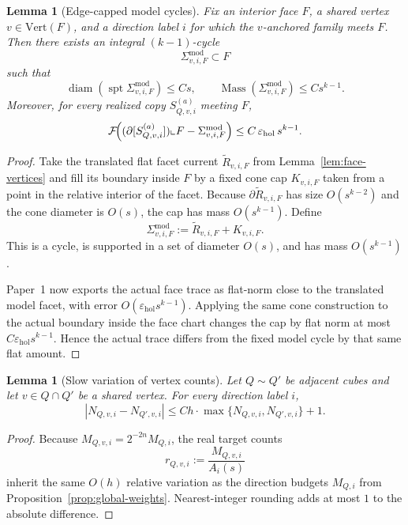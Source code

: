\documentclass[11pt]{article}
\numberwithin{equation}{section}
\theoremstyle{plain}
\newtheorem{lemma}[theorem]{Lemma}
\theoremstyle{definition}
\theoremstyle{remark}
\DeclareMathOperator{\Mass}{Mass}
\DeclareMathOperator{\spt}{spt}
\DeclareMathOperator{\diam}{diam}
\newcommand{\eps}{\varepsilon}
\newcommand{\calF}{\mathcal{F}}
\begin{document}
\begin{lemma}[Edge-capped model cycles]\label{lem:face-cycles}
Fix an interior face $F$, a shared vertex $v\in\mathrm{Vert}(F)$, and a direction label $i$ for which the $v$-anchored family meets $F$.  Then there exists an integral $(k-1)$-cycle
\[
\Sigma^{\mathrm{mod}}_{v,i,F}\subset F
\]
such that
\[
\diam(\spt \Sigma^{\mathrm{mod}}_{v,i,F})\le Cs,
\qquad
\Mass(\Sigma^{\mathrm{mod}}_{v,i,F})\le C s^{k-1}.
\]
Moreover, for every realized copy $S_{Q,v,i}^{(a)}$ meeting $F$,
\[
\calF\!\Bigl((\partial[S_{Q,v,i}^{(a)}])\llcorner F-\Sigma^{\mathrm{mod}}_{v,i,F}\Bigr)
\le C\,\eps_{\mathrm{hol}}\,s^{k-1}.
\]
\end{lemma}

\begin{proof}
Take the translated flat facet current $\widetilde R_{v,i,F}$ from Lemma~\ref{lem:face-vertices} and fill its boundary inside $F$ by a fixed cone cap $K_{v,i,F}$ taken from a point in the relative interior of the facet.  Because $\partial \widetilde R_{v,i,F}$ has size $O(s^{k-2})$ and the cone diameter is $O(s)$, the cap has mass $O(s^{k-1})$.  Define
\[
\Sigma^{\mathrm{mod}}_{v,i,F}:=\widetilde R_{v,i,F}+K_{v,i,F}.
\]
This is a cycle, is supported in a set of diameter $O(s)$, and has mass $O(s^{k-1})$.

Paper~1 now exports the actual face trace as flat-norm close to the translated model facet, with error $O(\eps_{\mathrm{hol}}s^{k-1})$.  Applying the same cone construction to the actual boundary inside the face chart changes the cap by flat norm at most $C\eps_{\mathrm{hol}}s^{k-1}$.  Hence the actual trace differs from the fixed model cycle by that same flat amount.
\end{proof}

\begin{lemma}[Slow variation of vertex counts]\label{lem:slow-variation}
Let $Q\sim Q'$ be adjacent cubes and let $v\in Q\cap Q'$ be a shared vertex.  For every direction label $i$,
\[
|N_{Q,v,i}-N_{Q',v,i}|\le C h\cdot \max\{N_{Q,v,i},N_{Q',v,i}\}+1.
\]
\end{lemma}

\begin{proof}
Because $M_{Q,v,i}=2^{-2n}M_{Q,i}$, the real target counts
\[
r_{Q,v,i}:=\frac{M_{Q,v,i}}{A_i(s)}
\]
inherit the same $O(h)$ relative variation as the direction budgets $M_{Q,i}$ from Proposition~\ref{prop:global-weights}.  Nearest-integer rounding adds at most $1$ to the absolute difference.
\end{proof}
\end{document}
